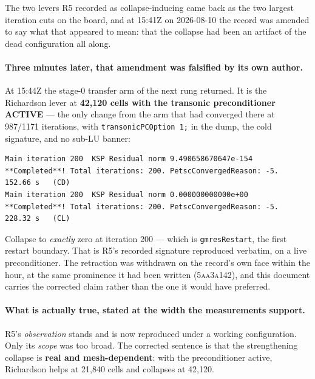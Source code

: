 \documentclass[11pt,a4paper]{article}
\newcommand{\commit}[1]{\textsc{\small #1}}
\begin{document}
The two levers R5 recorded as collapse-inducing came back as the two largest iteration cuts on
the board, and at 15:41Z on 2026-08-10 the record was amended to say what that appeared to
mean: that the collapse had been an artifact of the dead configuration all along.

\paragraph{Three minutes later, that amendment was falsified by its own author.} At 15:44Z the
stage-0 transfer arm of the next rung returned. It is the Richardson lever at \textbf{42{,}120
cells with the transonic preconditioner ACTIVE} --- the only change from the arm that had
converged there at 987/1171 iterations, with \texttt{transonicPCOption 1;} in the dump, the
cold signature, and no sub-LU banner:

\begin{lstlisting}
Main iteration 200  KSP Residual norm 9.490658670647e-154
**Completed**! Total iterations: 200. PetscConvergedReason: -5.  152.66 s   (CD)
Main iteration 200  KSP Residual norm 0.000000000000e+00
**Completed**! Total iterations: 200. PetscConvergedReason: -5.  228.32 s   (CL)
\end{lstlisting}

Collapse to \emph{exactly} zero at iteration 200 --- which is \texttt{gmresRestart}, the first
restart boundary. That is R5's recorded signature reproduced verbatim, on a live
preconditioner. The retraction was withdrawn on the record's own face within the hour, at the
same prominence it had been written (\commit{5aa3a142}), and this document carries the
corrected claim rather than the one it would have preferred.

\paragraph{What is actually true, stated at the width the measurements support.} R5's
\emph{observation} stands and is now reproduced under a working configuration. Only its
\emph{scope} was too broad. The corrected sentence is that the strengthening collapse is
\textbf{real and mesh-dependent}: with the preconditioner active, Richardson helps at 21{,}840
cells and collapses at 42{,}120.
\end{document}
